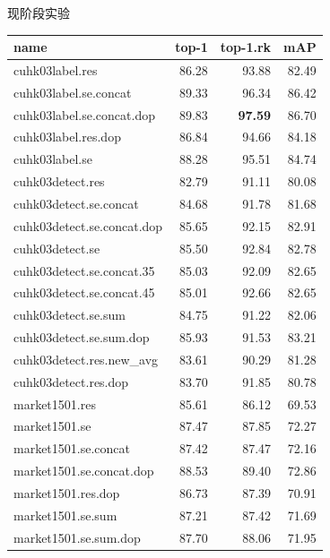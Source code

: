 \documentclass[notes]{beamer}
\begin{document}
\begin{frame}{现阶段实验}
	\begin{table}
		\begin{tabular}{lrrr}
			\toprule
			{name} &  top-1 &  top-1.rk &    mAP \\
			\midrule
			cuhk03label.res             &  86.28 &     93.88 &  82.49 \\
			cuhk03label.se.concat       &  89.33 &     96.34 &  86.42 \\
			cuhk03label.se.concat.dop   &  89.83 &     \textbf{97.59} &  86.70 \\
			cuhk03label.res.dop         &  86.84 &     94.66 &  84.18 \\
			cuhk03label.se              &  88.28 &     95.51 &  84.74 \\
			cuhk03detect.res            &  82.79 &     91.11 &  80.08 \\
			cuhk03detect.se.concat      &  84.68 &     91.78 &  81.68 \\
			cuhk03detect.se.concat.dop  &  85.65 &     92.15 &  82.91 \\
			cuhk03detect.se             &  85.50 &     92.84 &  82.78 \\
			cuhk03detect.se.concat.35   &  85.03 &     92.09 &  82.65 \\
			cuhk03detect.se.concat.45   &  85.01 &     92.66 &  82.65 \\
			cuhk03detect.se.sum         &  84.75 &     91.22 &  82.06 \\
			cuhk03detect.se.sum.dop     &  85.93 &     91.53 &  83.21 \\
			cuhk03detect.res.new\_avg    &  83.61 &     90.29 &  81.28 \\
			cuhk03detect.res.dop        &  83.70 &     91.85 &  80.78 \\			
			market1501.res              &  85.61 &     86.12 &  69.53 \\
			market1501.se               &  87.47 &     87.85 &  72.27 \\
			market1501.se.concat        &  87.42 &     87.47 &  72.16 \\
			market1501.se.concat.dop    &  88.53 &     89.40 &  72.86 \\
			market1501.res.dop          &  86.73 &     87.39 &  70.91 \\
			market1501.se.sum           &  87.21 &     87.42 &  71.69 \\
			market1501.se.sum.dop       &  87.70 &     88.06 &  71.95 \\
			\bottomrule
			\end{tabular}
	\end{table}
\end{frame}
\end{document}

